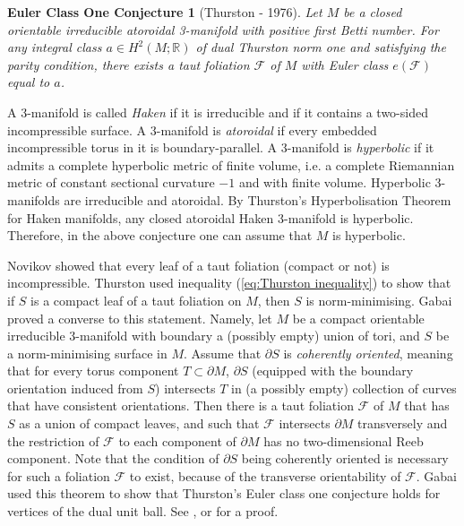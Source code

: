 \documentclass[11pt]{amsart}
\newtheorem*{eulerclassone}{Euler Class One Conjecture}
\theoremstyle{remark}
\theoremstyle{definition}
\begin{document}
\begin{eulerclassone}[Thurston - 1976]
	Let $M$ be a closed orientable irreducible atoroidal 3-manifold with positive first Betti number. For any integral class $a \in H^2(M ; \mathbb{R})$ of dual Thurston norm one and satisfying the parity condition, there exists a taut foliation $\mathcal{F}$ of $M$ with Euler class $e(\mathcal{F})$ equal to $a$. 
\end{eulerclassone}
	
	A 3-manifold is called \emph{Haken} if it is irreducible and if it contains a two-sided incompressible surface. A 3-manifold is \emph{atoroidal} if every embedded incompressible torus in it is boundary-parallel. A 3-manifold is \emph{hyperbolic} if it admits a complete hyperbolic metric of finite volume, i.e. a complete Riemannian metric of constant sectional curvature $-1$ and with finite volume. Hyperbolic 3-manifolds are irreducible and atoroidal. By Thurston's Hyperbolisation Theorem for Haken manifolds, any closed atoroidal Haken 3-manifold is hyperbolic. Therefore, in the above conjecture one can assume that $M$ is hyperbolic. 
	
	Novikov \cite{novikov1965topology} showed that every leaf of a taut foliation (compact or not) is incompressible. Thurston \cite{thurston1986norm} used inequality (\ref{eq:Thurston inequality}) to show that if $S$ is a compact leaf of a taut foliation on $M$, then $S$ is norm-minimising. Gabai \cite{gabai1983foliations} proved a converse to this statement. Namely, let $M$ be a compact orientable irreducible 3-manifold with boundary a (possibly empty) union of tori, and $S$ be a norm-minimising surface in $M$. Assume that $\partial S$ is \emph{coherently oriented}, meaning that for every torus component $T \subset \partial M$, $\partial S$ (equipped with the boundary orientation induced from $S$) intersects $T$ in (a possibly empty) collection of curves that have consistent orientations. Then there is a taut foliation $\mathcal{F}$ of $M$ that has $S$ as a union of compact leaves, and such that $\mathcal{F}$ intersects $\partial M$ transversely and the restriction of $\mathcal{F}$ to each component of $\partial M$ has no two-dimensional Reeb component. Note that the condition of $\partial S$ being coherently oriented is necessary for such a foliation $\mathcal{F}$ to exist, because of the transverse orientability of $\mathcal{F}$. Gabai used this theorem to show that Thurston's Euler class one conjecture holds for vertices of the dual unit ball. See \cite[Remark 7.3]{gabai1997problems}, or \cite{gabai2020fullymarked} for a proof. 
	
\end{document}
